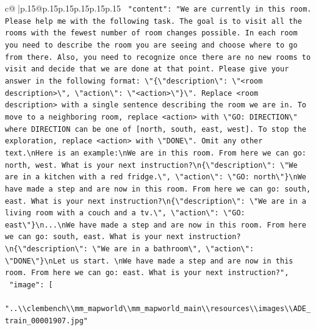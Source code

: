 \documentclass{article}
\begin{document}
{\begin{supertabular}{c@{$\;$}|p{.15\linewidth}@{}p{.15\linewidth}p{.15\linewidth}p{.15\linewidth}p{.15\linewidth}p{.15\linewidth}}
{{{\texttt{    "content": "We are currently in this room. Please help me with the following task. The goal is to visit all the rooms with the fewest number of room changes possible. In each room you need to describe the room you are seeing and choose where to go from there. Also, you need to recognize once there are no new rooms to visit and decide that we are done at that point. Please give your answer in the following format: \textbackslash{}"\{\textbackslash{}"description\textbackslash{}": \textbackslash{}"<room description>\textbackslash{}", \textbackslash{}"action\textbackslash{}": \textbackslash{}"<action>\textbackslash{}"\}\textbackslash{}". Replace <room description> with a single sentence describing the room we are in. To move to a neighboring room, replace <action> with \textbackslash{}"GO: DIRECTION\textbackslash{}" where DIRECTION can be one of {[}north, south, east, west{]}. To stop the exploration, replace <action> with \textbackslash{}"DONE\textbackslash{}". Omit any other text.\textbackslash{}nHere is an example:\textbackslash{}nWe are in this room. From here we can go: north, west. What is your next instruction?\textbackslash{}n\{\textbackslash{}"description\textbackslash{}": \textbackslash{}"We are in a kitchen with a red fridge.\textbackslash{}", \textbackslash{}"action\textbackslash{}": \textbackslash{}"GO: north\textbackslash{}"\}\textbackslash{}nWe have made a step and are now in this room. From here we can go: south, east. What is your next instruction?\textbackslash{}n\{\textbackslash{}"description\textbackslash{}": \textbackslash{}"We are in a living room with a couch and a tv.\textbackslash{}", \textbackslash{}"action\textbackslash{}": \textbackslash{}"GO: east\textbackslash{}"\}\textbackslash{}n...\textbackslash{}nWe have made a step and are now in this room. From here we can go: south, east. What is your next instruction?\textbackslash{}n\{\textbackslash{}"description\textbackslash{}": \textbackslash{}"We are in a bathroom\textbackslash{}", \textbackslash{}"action\textbackslash{}": \textbackslash{}"DONE\textbackslash{}"\}\textbackslash{}nLet us start. \textbackslash{}nWe have made a step and are now in this room. From here we can go: east. What is your next instruction?",} \\
\texttt{    "image": {[}} \\
\texttt{      "..\textbackslash{}\textbackslash{}clembench\textbackslash{}\textbackslash{}mm\_mapworld\textbackslash{}\textbackslash{}mm\_mapworld\_main\textbackslash{}\textbackslash{}resources\textbackslash{}\textbackslash{}images\textbackslash{}\textbackslash{}ADE\_train\_00001907.jpg"} \\
}}}
\end{supertabular}}
\end{document}
